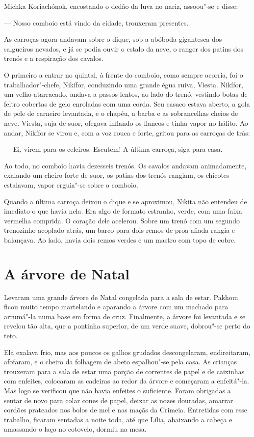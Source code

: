Michka Koriachónok, encostando o dedão da luva no nariz, assoou"-se e
disse:

--- Nosso comboio está vindo da cidade, trouxeram presentes.

As carroças agora andavam sobre o dique, sob a abóboda gigantesca dos
salgueiros nevados, e já se podia ouvir o estalo da neve, o ranger dos
patins dos trenós e a respiração dos cavalos.

O primeiro a entrar no quintal, à frente do comboio, como sempre
ocorria, foi o trabalhador"-chefe, Nikífor, conduzindo uma grande égua
ruiva, Viesta. Nikífor, um velho atarracado, andava a passos lentos, ao
lado do trenó, vestindo botas de feltro cobertas de gelo enroladas com
uma corda. Seu casaco estava aberto, a gola de pele de carneiro
levantada, e o chapéu, a barba e as sobrancelhas cheios de neve. Viesta,
suja de suor, ofegava inflando os flancos e tinha vapor no hálito. Ao
andar, Nikífor se virou e, com a voz rouca e forte, gritou para as
carroças de trás:

--- Ei, virem para os celeiros. Escutem! A última carroça, siga para
casa.

Ao todo, no comboio havia dezesseis trenós. Os cavalos andavam
animadamente, exalando um cheiro forte de suor, os patins dos trenós
rangiam, os chicotes estalavam, vapor erguia"-se sobre o comboio.

Quando a última carroça deixou o dique e se aproximou, Nikita não
entendeu de imediato o que havia nela. Era algo de formato estranho,
verde, com uma faixa vermelha comprida. O coração dele acelerou. Sobre
um trenó com um segundo trenozinho acoplado atrás, um barco para
dois remos de proa afiada rangia e balançava. Ao lado, havia dois remos
verdes e um mastro com topo de cobre.


\chapter{A árvore de Natal}

Levaram uma grande árvore de Natal congelada para a sala de estar.
Pakhom ficou muito tempo martelando e aparando a árvore com um machado
para arrumá"-la numa base em forma de cruz. Finalmente, a árvore foi
levantada e se revelou tão alta, que a pontinha superior, de um verde
suave, dobrou"-se perto do teto.

Ela exalava frio, mas aos poucos os galhos grudados descongelaram,
endireitaram, afofaram, e o cheiro da folhagem de abeto espalhou"-se pela
casa. As crianças trouxeram para a sala de estar uma porção de correntes
de papel e de caixinhas com enfeites, colocaram as cadeiras ao redor da
árvore e começaram a enfeitá"-la. Mas logo se verificou que não havia
enfeites o suficiente. Foram obrigadas a sentar de novo para colar cones
de papel, deixar as nozes douradas, amarrar cordões prateados nos bolos
de mel e nas maçãs da Crimeia. Entretidas com esse trabalho, ficaram
sentadas a noite toda, até que Lília, abaixando a cabeça e amassando o
laço no cotovelo, dormiu na mesa.

